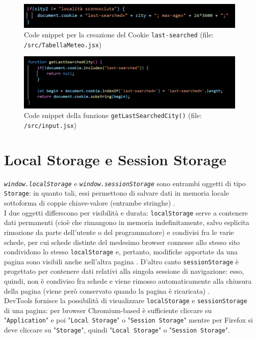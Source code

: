 \documentclass[a4paper, 12pt, twoside, openright]{book}
\begin{document}
\begin{figure}[ht]
  \centering
  \includegraphics[width=14cm]{images/cookies/cookie.png}
  \caption{Code snippet per la creazione del Cookie \texttt{last-searched} (file: \texttt{/src/TabellaMeteo.jsx})}
  \label{cookie:cookie}
\end{figure}
\begin{figure}[ht]
  \centering
  \includegraphics[width=14cm]{images/cookies/getLastSearchedCity.png}
  \caption{Code snippet della funzione \texttt{getLastSearchedCity()} (file: \texttt{/src/input.jsx})}
  \label{cookie:getLastSearchedCity}
\end{figure}

\section{Local Storage e Session Storage}
\texttt{\textit{window.localStorage}} e \texttt{\textit{window.sessionStorage}} sono entrambi oggetti di tipo \texttt{Storage}: in quanto tali, essi permettono di salvare dati in memoria locale sottoforma di coppie chiave-valore (entrambe stringhe) \cite{MDN_Web_docs:storage_API}.\\
I due oggetti differscono per visibilità e durata: \texttt{localStorage} serve a contenere dati permanenti (cioè che rimangono in memoria indefinitamente, salvo esplicita rimozione da parte dell'utente o del programmatore) e condivisi fra le varie schede, per cui schede distinte del medesimo browser connesse allo stesso sito condividono lo stesso \texttt{localStorage} e, pertanto, modifiche apportate da una pagina sono visibili anche nell'altra pagina \cite{MDN_Web_docs:localStorage}. D'altro canto \texttt{sessionStorage} è progettato per contenere dati relativi alla singola sessione di navigazione: esso, quindi, non è condiviso fra schede e viene rimosso automaticamente alla chiusura della pagina (viene però conservato quando la pagina è ricaricata) \cite{MDN_Web_docs:sessionStorage}.\\
DevTools fornisce la possibilità di visualizzare \texttt{localStorage} e \texttt{sessionStorage} di una pagina: per browser Chromium-based è sufficiente cliccare su "\texttt{Application}" e poi "\texttt{Local Storage}" o "\texttt{Session Storage}" mentre per Firefox si deve cliccare su "\texttt{Storage}", quindi "\texttt{Local Storage}" o "\texttt{Session Storage}".
\end{document}

